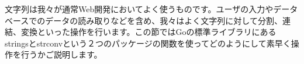 文字列は我々が通常Web開発においてよく使うものです。ユーザの入力やデータベースでのデータの読み取りなどを含め、我々はよく文字列に対して分割、連結、変換といった操作を行います。この節ではGoの標準ライブラリにあるstringsとstrconvという２つのパッケージの関数を使ってどのようにして素早く操作を行うかご説明します。
